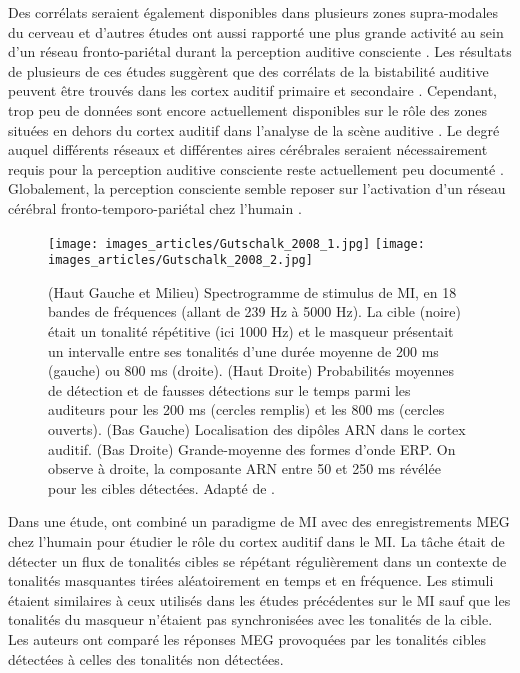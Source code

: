 Des corrélats seraient également disponibles dans plusieurs zones supra-modales du cerveau \citep{cusack2005intraparietal} et d'autres études ont aussi rapporté une plus grande activité au sein d'un réseau fronto-pariétal durant la perception auditive consciente \citep{eriksson2007similar, eriksson2017activity, giani2015detecting}. 
Les résultats de plusieurs de ces études suggèrent que des corrélats de la bistabilité auditive peuvent être trouvés dans les cortex auditif primaire et secondaire \citep{gutschalk2005neuromagnetic, gutschalk2008neural}. 
Cependant, trop peu de données sont encore actuellement disponibles sur le rôle des zones situées en dehors du cortex auditif dans l'analyse de la scène auditive \citep{albouy2013behavioral, cusack2005intraparietal, kondo2009involvement, pressnitzer2008perceptual}. 
Le degré auquel différents réseaux et différentes aires cérébrales seraient nécessairement requis pour la perception auditive consciente reste actuellement peu documenté \citep{dykstra2017roadmap, eklund2019electrophysiological, wiegand2018cortical}. 
Globalement, la perception consciente semble reposer sur l'activation d'un réseau cérébral fronto-temporo-pariétal chez l'humain \citep{demertzi2013consciousness}. 

\begin{figure*}[!t]
\center
\texttt{[image: images\_articles/Gutschalk\_2008\_1.jpg]}
\texttt{[image: images\_articles/Gutschalk\_2008\_2.jpg]}
\caption[Corrélats neuraux ERPs de la conscience perceptive auditive dans le MI]{(Haut Gauche et Milieu) Spectrogramme de stimulus de MI, en 18 bandes de fréquences (allant de 239 Hz à 5000 Hz). La cible (noire) était un tonalité répétitive (ici 1000 Hz) et le masqueur présentait un intervalle entre ses tonalités d'une durée moyenne de 200 ms (gauche) ou 800 ms (droite). (Haut Droite) Probabilités moyennes de détection et de fausses détections sur le temps parmi les auditeurs pour les 200 ms (cercles remplis) et les 800 ms (cercles ouverts). (Bas Gauche) Localisation des dipôles ARN dans le cortex auditif. (Bas Droite) Grande-moyenne des formes d'onde ERP. On observe à droite, la composante ARN entre 50 et 250 ms révélée pour les cibles détectées. Adapté de \cite{gutschalk2008neural}.}
\label{fig:chap2gutschalk2008}
\end{figure*}

Dans une étude, \cite{gutschalk2008neural} ont combiné un paradigme de MI avec des enregistrements MEG chez l'humain pour étudier le rôle du cortex auditif dans le MI. 
La tâche était de détecter un flux de tonalités cibles se répétant régulièrement dans un contexte de tonalités masquantes tirées aléatoirement en temps et en fréquence. 
Les stimuli étaient similaires à ceux utilisés dans les études précédentes sur le MI \citep{neff1987masking, kidd2003multiple} sauf que les tonalités du masqueur n'étaient pas synchronisées avec les tonalités de la cible. 
Les auteurs ont comparé les réponses MEG provoquées par les tonalités cibles détectées à celles des tonalités non détectées. 

